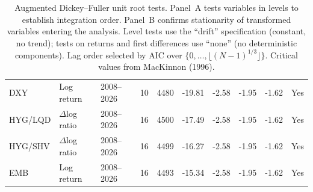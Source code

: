 \begin{table}[H]
{\begin{tabular}{lllrrrrrrl}
  DXY & Log return & 2008--2026 & 10 & 4480 & -19.81 & -2.58 & -1.95 & -1.62 & Yes \\ 
  HYG/LQD & $\Delta$log ratio & 2008--2026 & 16 & 4500 & -17.49 & -2.58 & -1.95 & -1.62 & Yes \\ 
  HYG/SHV & $\Delta$log ratio & 2008--2026 & 16 & 4499 & -16.27 & -2.58 & -1.95 & -1.62 & Yes \\ 
  EMB & Log return & 2008--2026 & 16 & 4493 & -15.34 & -2.58 & -1.95 & -1.62 & Yes \\ 
  \bottomrule
\end{tabular}
}
\caption{Augmented Dickey--Fuller unit root tests. Panel~A tests variables in levels to establish integration order. Panel~B confirms stationarity of transformed variables entering the analysis. Level tests use the ``drift'' specification (constant, no trend); tests on returns and first differences use ``none'' (no deterministic components). Lag order selected by AIC over $\{0, \ldots, \lfloor(N{-}1)^{1/3}\rfloor\}$. Critical values from MacKinnon (1996).}
\label{tab:adf_all}
\end{table}
